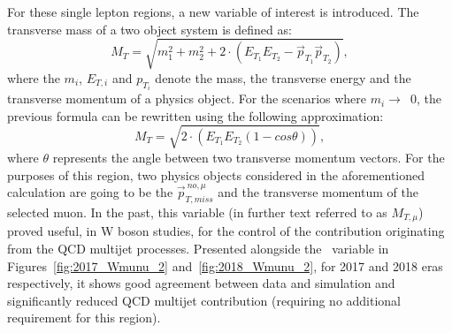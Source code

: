 \hspace{10pt} For these single lepton regions, a new variable of interest is introduced. The transverse mass of a two object system is defined as:
\begin{equation}
    M_T= \sqrt{m_1^2+m_2^2+2\cdot(E_{T_1}E_{T_2}-\vec{p}_{T_1}\vec{p}_{T_2})},
\end{equation}
where the $m_i$, $E_{T,i}$ and $p_{T_i}$ denote the mass, the transverse energy and the transverse momentum of a physics object. For the scenarios where $m_i\rightarrow$~0, the previous formula can be rewritten using the following approximation:
\begin{equation}
    M_T= \sqrt{2\cdot(E_{T_1}E_{T_2}(1-cos\theta))},
\end{equation}
where $\theta$ represents the angle between two transverse momentum vectors. For the purposes of this region, two physics objects considered in the aforementioned calculation are going to be the $\vec{p}_{T, miss}^{~no,\mu}$ and the transverse momentum of the selected muon. In the past, this variable (in further text referred to as $M_{T, \mu}$) proved useful, in W boson studies, for the control of the contribution originating from the QCD multijet processes. Presented alongside the \mindphinomu~variable in Figures~\ref{fig:2017_Wmunu_2} and~\ref{fig:2018_Wmunu_2}, for 2017 and 2018 eras respectively, it shows good agreement between data and simulation and significantly reduced QCD multijet contribution (requiring no additional requirement for this region).




